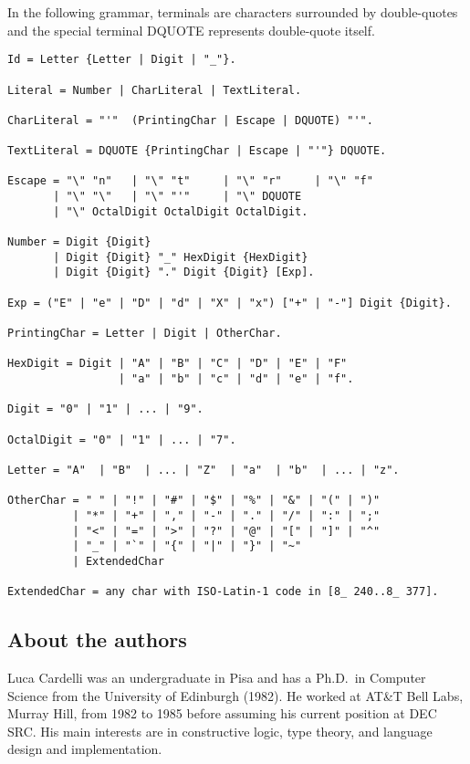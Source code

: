 \documentclass[10pt]{article}
\begin{document}
In the following grammar, terminals are characters surrounded by double-quotes
and the special terminal DQUOTE represents double-quote itself.

\begin{verbatim}
Id = Letter {Letter | Digit | "_"}.

Literal = Number | CharLiteral | TextLiteral.

CharLiteral = "'"  (PrintingChar | Escape | DQUOTE) "'".

TextLiteral = DQUOTE {PrintingChar | Escape | "'"} DQUOTE.

Escape = "\" "n"   | "\" "t"     | "\" "r"     | "\" "f"
       | "\" "\"   | "\" "'"     | "\" DQUOTE
       | "\" OctalDigit OctalDigit OctalDigit.

Number = Digit {Digit}
       | Digit {Digit} "_" HexDigit {HexDigit}
       | Digit {Digit} "." Digit {Digit} [Exp].

Exp = ("E" | "e" | "D" | "d" | "X" | "x") ["+" | "-"] Digit {Digit}.

PrintingChar = Letter | Digit | OtherChar.

HexDigit = Digit | "A" | "B" | "C" | "D" | "E" | "F"
                 | "a" | "b" | "c" | "d" | "e" | "f".

Digit = "0" | "1" | ... | "9".

OctalDigit = "0" | "1" | ... | "7".

Letter = "A"  | "B"  | ... | "Z"  | "a"  | "b"  | ... | "z".

OtherChar = " " | "!" | "#" | "$" | "%" | "&" | "(" | ")"
          | "*" | "+" | "," | "-" | "." | "/" | ":" | ";"
          | "<" | "=" | ">" | "?" | "@" | "[" | "]" | "^"
          | "_" | "`" | "{" | "|" | "}" | "~"
          | ExtendedChar

ExtendedChar = any char with ISO-Latin-1 code in [8_ 240..8_ 377].
\end{verbatim}

\subsection*{About the authors}

Luca Cardelli was an undergraduate in Pisa and has a Ph.D.\ in Computer Science
from the University of Edinburgh (1982).  He worked at AT\&T Bell Labs, Murray
Hill, from 1982 to 1985 before assuming his current position at DEC SRC.  His
main interests are in constructive logic, type theory, and language design and
implementation.
\end{document}
